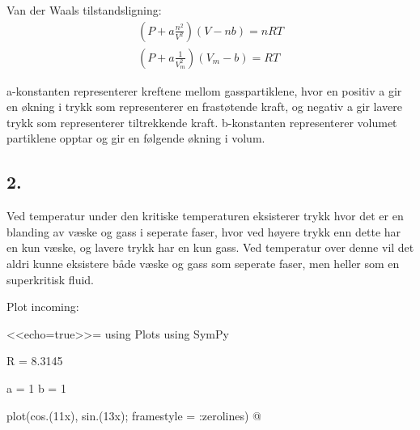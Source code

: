 Van der Waals tilstandsligning:
\begin{gather*}
	\left(P + a \frac{n^2}{V^2}\right)\left(V - n b\right) = n R T
	\\
	\left(P + a \frac{1}{V_m^2}\right)\left(V_m - b\right) = R T
\end{gather*}

a-konstanten representerer kreftene mellom gasspartiklene, hvor en positiv a gir en økning i trykk som representerer en frastøtende kraft, og negativ a gir lavere trykk som representerer tiltrekkende kraft.
b-konstanten representerer volumet partiklene opptar og gir en følgende økning i volum.

\subsection*{2.}

Ved temperatur under den kritiske temperaturen eksisterer trykk hvor det er en blanding av væske og gass i seperate faser, hvor ved høyere trykk enn dette har en kun væske, og lavere trykk har en kun gass. Ved temperatur over denne vil det aldri kunne eksistere både væske og gass som seperate faser, men heller som en superkritisk fluid.

\newpage

Plot incoming:

<<echo=true>>=
using Plots
using SymPy

R = 8.3145

a = 1
b = 1


plot(cos.(11x), sin.(13x); framestyle = :zerolines)
@
